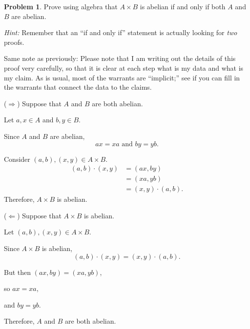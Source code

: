 \documentclass[12pt]{article}
\theoremstyle{definition} %
\newtheorem{problem}{Problem}
\newcommand{\Alert}[1]{\textcolor{xRed}{#1}}
\newenvironment{red}{\color{red}}{\ignorespacesafterend}
\begin{document}
\begin{problem}
    Prove using algebra that $A\times B$ is abelian \Alert{if and only if} both $A$ and $B$ are abelian.

    \textit{Hint:} Remember that an \Alert{``if and only if''} statement is actually looking for \textit{two} proofs.

    \begin{red}
        Same note as previously: Please note that I am writing out the details of this proof very carefully, so that it is clear at each step what is my data and what is my claim. As is usual, most of the warrants are ``implicit;'' see if you can fill in the warrants that connect the data to the claims.
    \end{red}
    \begin{multicols}{2}
        ($\Rightarrow$) Suppose that $A$ and $B$ are both abelian.

        \begin{red}
            Let $a, x\in A$ and $b, y\in B$. 
            
            Since $A$ and $B$ are abelian,
            \[ax = xa \text{ and } by = yb.\]

            Consider $(a, b), (x, y)\in A\times B$.
            \begin{align*}
                (a, b)\cdot(x, y) &= (ax, by) \\
                &= (xa, yb) \\
                &= (x, y) \cdot (a,b).
            \end{align*}
        \end{red}
        Therefore, $A\times B$ is abelian.

        \columnbreak

        ($\Leftarrow$) Suppose that $A\times B$ is abelian.

        \begin{red}
            Let $(a, b), (x, y)\in A\times B$. 
            
            Since $A\times B$ is abelian, \[(a, b)\cdot(x, y) = (x, y) \cdot (a,b).\]
                
            But then $(ax, by) = (xa, yb)$,

            so $ax = xa$, 

            and $by = yb$.
        \end{red}

        Therefore, $A$ and $B$ are both abelian.
    \end{multicols}
    
\end{problem}
\end{document}
